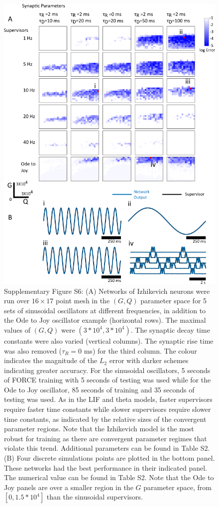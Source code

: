 \documentclass[11pt]{article} %
\begin{document}
\clearpage


\begin{figure}[htp!]
\centering
\includegraphics[scale=0.80]{FFIGS8}
\caption*{Supplementary Figure S6: (A)  Networks of Izhikevich neurons were run over $16\times17$ point mesh in the $(G,Q)$ parameter space for 5 sets of sinusoidal oscillators at different frequencies, in addition to the Ode to Joy oscillator example (horizontal rows).  The maximal values of $(G,Q)$ were $(3*10^4,3*10^4)$.  The synaptic decay time constants were also varied (vertical columns).   The synaptic rise time was also removed ($\tau_R =0$ ms) for the third column.  The colour indicates the magnitude of the $L_2$ error with darker schemes indicating greater accuracy.   For the sinusoidal oscillators, 5 seconds of FORCE training with 5 seconds of testing was used while for the Ode to Joy oscillator, 85 seconds of training and 35 seconds of testing was used. As in the LIF and theta models, faster supervisors require faster time constants while slower supervisors require slower time constants, as indicated by the relative sizes of the convergent parameter regions.  Note that the Izhikevich model is the most robust for training as there are convergent parameter regimes that violate this trend. Additional parameters can be found in Table S2.  (B) Four discrete simulations points are plotted in the bottom panel.  These networks had the best performance in their indicated panel. The numerical value can be found in Table S2. Note that the Ode to Joy panels are over a smaller region in the $G$ parameter space, from $[0,1.5*10^4]$ than the sinusoidal supervisors.} 
\end{figure}
\clearpage
\end{document}
